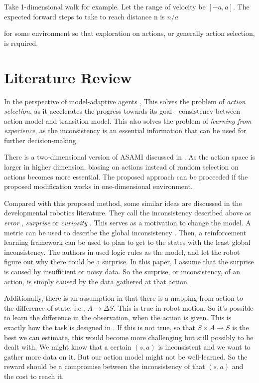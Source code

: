 \documentclass[10pt]{IEEEtran}
\begin{document}
Take 1-dimensional walk for example. Let the range of velocity be
$[-a, a]$. The expected forward steps to take to reach distance n is
$n/a$


for some environment so that exploration on actions, or
generally action selection, is required.

\section{Literature Review}

In the perspective of model-adaptive agents \cite{maes1993modeling},
This solves the problem of \textit{action selection}, as it
accelerates the progress towards its goal - consistency between action
model and transition model. This also solves the problem of
\textit{learning from experience}, as the inconsistency is an
essential information that can be used for further decision-making.

There is a two-dimensional version of ASAMI discussed in
\cite{ICRA08-stronger}.  As the action space is larger in higher
dimension, biasing on actions instead of random selection on actions
becomes more essential. The proposed approach can be proceeded if the
proposed modification works in one-dimensional environment.

Compared with this proposed method, some similar ideas are discussed
in the developmental robotics literature. They call the inconsistency
described above as \textit{error} \cite{oudeyer2006discovering},
\textit{surprise} \cite{ranasinghe2008surprise} or \textit{curiosity}
\cite{schmidhuber2006developmental}. This serves as a motivation to
change the model. A metric can be used to describe the global
inconsistency \cite{oudeyer2006discovering}. Then, a reinforcement
learning framework can be used to plan to get to the states with the
least global inconsistency. The authors in
\cite{ranasinghe2008surprise} used logic rules as the model, and let
the robot figure out why there could be a surprise. In this paper, I
assume that the surprise is caused by insufficient or noisy data. So
the surprise, or inconsistency, of an action, is simply caused by the
data gathered at that action.

Additionally, there is an assumption in \cite{CSJ06} that there is a
mapping from action to the difference of state, i.e., $A \rightarrow
\Delta S$.  This is true in robot motion. So it's possible to learn
the difference in the observation, when the action is given. This is
exactly how the task is designed in \cite{ICDL10-hester}. If this is
not true, so that $S \times A \rightarrow S$ is the best we can
estimate, this would become more challenging but still possibly to be
dealt with. We might know that a certain $(s, a)$ is inconsistent and
we want to gather more data on it. But our action model might not be
well-learned. So the reward should be a compromise between the
inconsistency of that $(s, a)$ and the cost to reach it.
\end{document}
